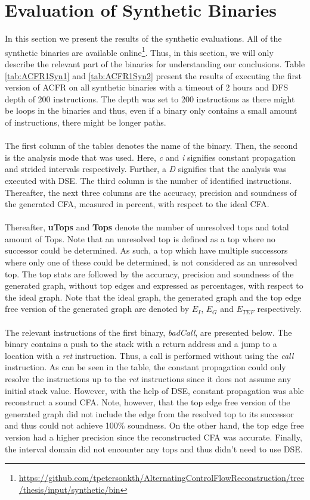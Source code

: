 \documentclass{kththesis}
\renewcommand{\it}[1]{\textit{#1}}
\begin{document}
\section{Evaluation of Synthetic Binaries}\label{sec:synEval}
In this section we present the results of the synthetic evaluations. All of the synthetic binaries are available online\footnote{\url{https://github.com/tpetersonkth/AlternatingControlFlowReconstruction/tree/thesis/input/synthetic/bin}}. Thus, in this section, we will only describe the relevant part of the binaries for understanding our conclusions. Table \ref{tab:ACFR1Syn1} and \ref{tab:ACFR1Syn2} present the results of executing the first version of ACFR on all synthetic binaries with a timeout of 2 hours and DFS depth of 200 instructions. The depth was set to 200 instructions as there might be loops in the binaries and thus, even if a binary only contains a small amount of instructions, there might be longer paths.
\\ \\
The first column of the tables denotes the name of the binary. Then, the second is the analysis mode that was used. Here, \it{c} and \it{i} signifies constant propagation and strided intervals respectively. Further, a \it{D} signifies that the analysis was executed with DSE. The third column is the number of identified instructions. Thereafter, the next three columns are the accuracy, precision and soundness of the generated CFA, measured in percent, with respect to the ideal CFA. 
\\ \\
Thereafter, \textbf{uTops} and \textbf{Tops} denote the number of unresolved tops and total amount of Tops. Note that an unresolved top is defined as a top where no successor could be determined. As such, a top which have multiple successors where only one of these could be determined, is not considered as an unresolved top. The top stats are followed by the accuracy, precision and soundness of the generated graph, without top edges and expressed as percentages, with respect to the ideal graph. Note that the ideal graph, the generated graph and the top edge free version of the generated graph are denoted by $E_{I}$, $E_{G}$ and $E_{TEF}$ respectively.
\\ \\
The relevant instructions of the first binary, \it{badCall}, are presented below. The binary contains a push to the stack with a return address and a jump to a location with a \it{ret} instruction. Thus, a call is performed without using the \it{call} instruction. As can be seen in the table, the constant propagation could only resolve the instructions up to the \it{ret} instructions since it does not assume any initial stack value. However, with the help of DSE, constant propagation was able reconstruct a sound CFA. Note, however, that the top edge free version of the generated graph did not include the edge from the resolved top to its successor and thus could not achieve 100\% soundness. On the other hand, the top edge free version had a higher precision since the reconstructed CFA was accurate. Finally, the interval domain did not encounter any tops and thus didn't need to use DSE.
\end{document}
